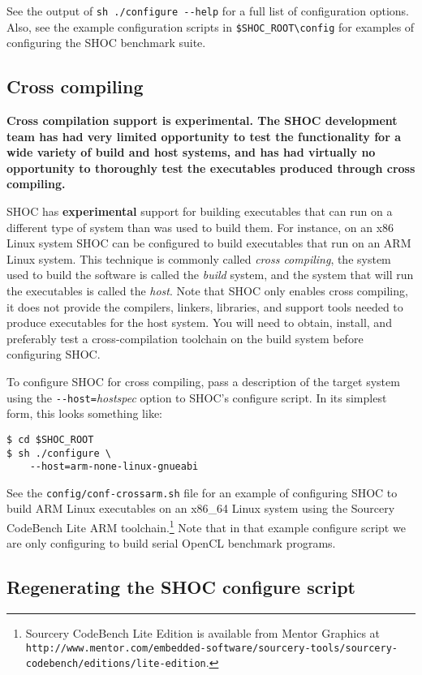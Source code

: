 \documentclass[11pt]{article}
\begin{document}
See the output of \verb+sh ./configure --help+ for a full list of configuration 
options.
Also, see the example configuration scripts in \verb+$SHOC_ROOT\config+ for
examples of configuring the SHOC benchmark suite.

\subsection{Cross compiling}

{\bf 
Cross compilation support is experimental.
The SHOC development team has had very limited opportunity to test the
functionality for a wide variety of build and host systems, and has had
virtually no opportunity to thoroughly test the executables produced through
cross compiling.
}

SHOC has {\bf experimental} support for building executables that can run on
a different type of system than was used to build them.
For instance, on an x86 Linux system SHOC can be configured to build 
executables that run on an ARM Linux system.
This technique is commonly called {\em cross compiling}, the system
used to build the software is called the {\em build} system, and the system
that will run the executables is called the {\em host}.
Note that SHOC only enables cross compiling, it does not provide
the compilers, linkers, libraries, and support tools needed to produce
executables for the host system.
You will need to obtain, install, and preferably test a cross-compilation
toolchain on the build system before configuring SHOC.

To configure SHOC for cross compiling, pass a description of the target
system using the \verb+--host=+{\em hostspec} option to SHOC's configure
script.
In its simplest form, this looks something like:
\begin{Verbatim}[frame=single]
$ cd $SHOC_ROOT
$ sh ./configure \
    --host=arm-none-linux-gnueabi
\end{Verbatim}
\noindent See the {\tt config/conf-crossarm.sh} file for an example of 
configuring SHOC to build ARM Linux executables on an x86\_64 Linux system
using the Sourcery CodeBench Lite ARM toolchain.\footnote{Sourcery CodeBench
Lite Edition is available from Mentor Graphics at 
{\tt http://www.mentor.com/embedded-software/sourcery-tools/sourcery-codebench/editions/lite-edition}.}
Note that in that example configure script we are only configuring to build
serial OpenCL benchmark programs.



\subsection{Regenerating the SHOC configure script}
\end{document}
